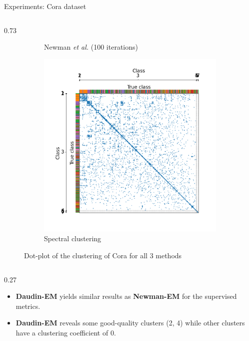 \documentclass[final]{beamer}
\newlength{\colwidth}
\begin{document}
\begin{frame}[t]
\begin{columns}[t]
\begin{column}{\colwidth}
\begin{block}{Experiments: Cora dataset}
\begin{column}{0.73\colwidth}
\begin{figure}[H]
\begin{subfigure}{0.45\linewidth}
              \caption{Newman \textit{et al.} (100 iterations)}
              \label{fig:cora_newman}
            \end{subfigure}
            \hspace{0.5em}
            \begin{subfigure}{0.45\linewidth}
              \centering
              \includegraphics[width=\linewidth, trim={45 25 35 40}, clip]{figures/cora_spetral.png}
              \caption{Spectral clustering}
              \label{fig:cora_spectral}
            \end{subfigure}
            \hfill
            \caption{\centering Dot-plot of the clustering of Cora for all $3$ methods}
            \label{fig:cora_results}
          \end{figure}
        \end{column}
        \begin{column}{0.27\colwidth}
          \vspace{4em}
          \begin{itemize} \setlength\itemsep{1.5em}
            \justifying
            \item \textbf{Daudin-EM} yields similar results as \textbf{Newman-EM} for the supervised metrics.
            \item \textbf{Daudin-EM} reveals some good-quality clusters (2, 4) while other clusters have a clustering coefficient of 0.

\end{itemize}
\end{column}
\end{block}
\end{column}
\end{columns}
\end{frame}
\end{document}
